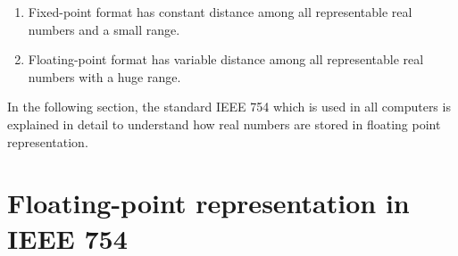 

\begin{IN}
\begin{enumerate}
\item Fixed-point format has constant distance among all representable real numbers and a small range. 
\item Floating-point format has variable distance among all representable real numbers with a huge range.  
\end{enumerate}
\end{IN}



In the following section, 
the standard IEEE 754 which is used in all computers is 
explained in detail to understand how real numbers are stored in 
floating point representation.




\section{Floating-point representation in IEEE 754}





